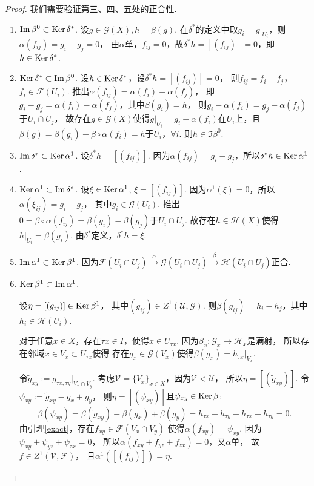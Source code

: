 \begin{proof} 我们需要验证第三、四、五处的正合性.
	\begin{enumerate}
	\item[1.] $\operatorname{Im}\beta^0 \subset \operatorname{Ker}\delta^*$. 
    设$g\in \mathscr{G}(X), h=\beta(g)$. 
    在$\delta^*$的定义中取$g_i=g|_{U_i}$，则$\alpha(f_{ij})=g_i-g_j=0$，
    由$\alpha$单，$f_{ij}=0$，故$\delta^*h=[(f_{ij})]=0$，即$h\in \operatorname{Ker}\delta^*$.
	\item[2.] $\operatorname{Ker}\delta^*\subset \operatorname{Im}\beta^0$. 
    设$h\in \operatorname{Ker}\delta^*$，设$\delta^*h=[(f_{ij})]=0$，
    则$f_{ij}=f_i-f_j$，$f_i\in \mathscr{F}(U_i)$. 
    推出$\alpha(f_{ij})=\alpha(f_i)-\alpha(f_j)$，
    即$g_i-g_j=\alpha(f_i)-\alpha(f_j)$，其中$\beta(g_i)=h$，
    则$g_i-\alpha(f_i)=g_j-\alpha(f_j)$于$U_i\cap U_j$，
    故存在$g\in \mathscr{G}(X)$使得$g|_{U_i}=g_i-\alpha(f_i)$在$U_i$上，且
	$\beta(g)=\beta(g_i)-\beta\circ \alpha(f_i)=h$于$U_i$，$\forall i$. 
    则$h\in \Im\beta^0$.
	\item[3.] $\operatorname{Im}\delta^*\subset \operatorname{Ker}\alpha^1$. 设$\delta^*h=[(f_{ij})]$. 
    因为$\alpha(f_{ij})=g_i-g_j$，所以$\delta^*h\in \operatorname{Ker}\alpha^1$.
	\item[4.] $\operatorname{Ker}\alpha^1\subset \operatorname{Im}\delta^*$. 
    设$\xi\in \operatorname{Ker}\alpha^1$, $\xi=[(f_{ij})]$. 
    因为$\alpha^1(\xi)=0$，所以$\alpha(\xi_{ij})=g_i-g_j$，
    其中$g_i \in \mathscr{G}(U_i)$. 
    推出$0=\beta \circ \alpha(f_{ij})=\beta(g_i)-\beta(g_j)$于$U_i\cap U_j$. 
    故存在$h\in \mathscr{H}(X)$使得$h|_{U_i}=\beta(g_i)$. 
    由$\delta^*$定义，$\delta^*h=\xi$.
	\item[5.] $\operatorname{Im}\alpha^1\subset \operatorname{Ker}\beta^1$. 
    因为$\mathscr{F}(U_i\cap U_j)\stackrel{\alpha}{\longrightarrow} \mathscr{G}(U_i\cap U_j) 
    \stackrel{\beta}{\longrightarrow} \mathscr{H}(U_i\cap U_j)$正合.
	\item[6.] $\operatorname{Ker}\beta^1\subset \operatorname{Im}\alpha^1$.

	\qquad 设$\eta=[(g_{ij})]\in \operatorname{Ker}\beta^1$，
    其中$(g_{ij})\in Z^1(\mathscr{U},\mathscr{G})$. 
    则$\beta(g_{ij})=h_i-h_j$，其中$h_i\in \mathscr{H}(U_i)$.

	\qquad 对于任意$x\in X$，存在$\tau x\in I$，使得$x \in U_{\tau x}$. 
    因为$\beta_x\colon \mathscr{G}_x\rightarrow \mathscr{H}_x$是满射，
    所以存在邻域$x\in V_x\subset U_{\tau x}$使得
    存在$g_{x}\in \mathscr{G}(V_x)$使得$\beta(g_x)=h_{\tau x}|_{V_x}$.

	\qquad 令$\tilde{g}_{xy}:=g_{\tau x, \tau y}|_{V_x\cap V_y}$. 
    考虑$\mathscr{V}=\{V_x\}_{x\in X}$，因为$\mathscr{V}<\mathscr{U}$，
    所以$\eta=[(\tilde{g}_{xy})]$. 令$\psi_{xy}:=\tilde{g}_{xy}-g_x+g_y$，
    则$\eta=[(\psi_{xy})]$且$\psi_{xy}\in \operatorname{Ker}\beta$:
	$$\beta(\psi_{xy})=\beta(\tilde{g}_{xy})-\beta(g_x)+\beta(g_y)
    =h_{\tau x}-h_{\tau y}-h_{\tau x}+h_{\tau y}=0.$$
	由引理\ref{exact}，存在$f_{xy}\in \mathscr{F}(V_x\cap V_y)$
    使得$\alpha(f_{xy})=\psi_{xy}$. 因为$\psi_{xy}+\psi_{yz}+\psi_{zx}=0$，
    所以$\alpha(f_{xy}+f_{yz}+f_{zx})=0$，又$\alpha$单，
    故$f\in Z^1(\mathscr{V},\mathscr{F})$，
    且$\alpha^1([(f_{ij})])=\eta$.\qedhere
	\end{enumerate}
\end{proof}
		
